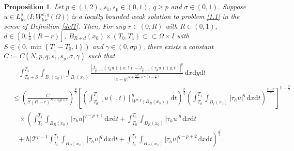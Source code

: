 \documentclass[reqno,10pt]{amsart}
\numberwithin{equation}{section}
\newtheorem{proposition}[theorem]{Proposition}
\begin{document}
\begin{proposition}
	\label{pro15}
	Let $p\in (1, 2)$, $s_1,s_p\in(0, 1)$, $q\ge p$ and $\sigma\in(0,1)$. Suppose $u\in L^q_{\mathrm{loc}}\bigl(I;W^{\sigma,q}_{\mathrm{loc}}(\Omega)\bigl)$ is a locally bounded weak solution to problem \eqref{1.1} in the sense of Definition \ref{def1}. Then, For any $r\in(0,R)$ with $R\in(0,1)$, $d\in\left(0,\frac{1}{4}(R-r)\right]$, $B_{R+d}(x_0)\times(T_0,T_1)\subset\subset\Omega\times I$ with $S\in\left( 0,\min\left\lbrace T_1-T_0,1\right\rbrace \right)$ and $\gamma\in(0,\sigma p)$, there exists a constant $C:=C(N,p,q,s_1,s_p,\sigma,\gamma)$ such that
	\begin{align}
		\label{15.0}
		&\quad\int_{T_0+S}^{T_1}\int_{B_r(x_0)}\int_{B_r(x_0)}\frac{\left|J_{\frac{q}{p}+1}(\tau_hu)(x,t)-J_{\frac{q}{p}+1}(\tau_hu)(y,t)\right|^p}{|x-y|^{N+\frac{s_pp^2}{2}+\gamma\left(1-\frac{p}{2}\right)}}\,\mathrm{d}x\mathrm{d}y\mathrm{d}t\nonumber\\
		&\le \left(\frac{C}{S(R-r)^{N+s_pp+1}}\right)^\frac{p}{2}\left[ \left( \int_{T_0}^{T_1}[u(\cdot,t)]^q_{W^{\sigma,q}(B_R(x_0))}\,\mathrm{d}t\right)^{\frac{p}{q}} \left(\int_{T_0}^{T_1}\int_{B_r(x_0)}|\tau_hu|^q\,\mathrm{d}x\mathrm{d}t \right)^{\frac{q-p}{q}}\right]^{1-\frac{p}{2}}\nonumber\\
		&\quad\times\left(\int_{T_0}^{T_1}\int_{B_R(x_0)}|\tau_hu|^{q-p+1}\,\mathrm{d}x\mathrm{d}t+\int_{T_0}^{T_1}\int_{B_R(x_0)}|\tau_hu|^{q}\,\mathrm{d}x\mathrm{d}t\right.\nonumber\\
		&\quad\left.+|h|\mathcal{T}^{p-1}\int_{T_0}^{T_1}\int_{B_R(x_0)}|\tau_hu|^{q}\,\mathrm{d}x\mathrm{d}t+\int_{T_0}^{T_1}\int_{B_R(x_0)}|\tau_hu|^{q-p+2}\,\mathrm{d}x\mathrm{d}t\right)^\frac{p}{2}.
	\end{align}
\end{proposition}
\end{document}
